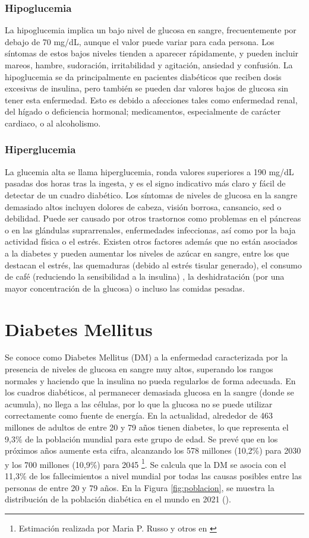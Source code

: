 \subsubsection{Hipoglucemia}
La hipoglucemia implica un bajo nivel de glucosa en sangre, frecuentemente por debajo de 70 mg/dL, aunque el valor puede variar para cada persona.
Los síntomas de estos bajos niveles tienden a aparecer rápidamente, y pueden incluir mareos, hambre, sudoración, irritabilidad y agitación, ansiedad y confusión. 
La hipoglucemia se da principalmente en pacientes diabéticos que reciben dosis excesivas de insulina, pero también se pueden dar valores bajos de glucosa sin tener esta enfermedad. Esto es debido a afecciones tales como enfermedad renal, del hígado o deficiencia hormonal; medicamentos, especialmente de carácter cardiaco, o al alcoholismo. 

\subsubsection{Hiperglucemia} \label{sec:hiperglucemia}
La glucemia alta se llama hiperglucemia, ronda valores superiores a 190 mg/dL pasadas dos horas tras la ingesta, y es el signo indicativo más claro y fácil de detectar de un cuadro diabético. 
Los síntomas de niveles de glucosa en la sangre demasiado altos incluyen dolores de cabeza, visión borrosa, cansancio, sed o debilidad. Puede ser causado por otros trastornos como problemas en el páncreas o en las glándulas suprarrenales, enfermedades infeccionas, así como por la baja actividad física o el estrés. Existen otros factores además que no están asociados a la diabetes y pueden aumentar los niveles de azúcar en sangre, entre los que destacan el estrés, las quemaduras (debido al estrés tisular generado), el consumo de café (reduciendo la sensibilidad a la insulina) ,  la deshidratación (por una mayor concentración de la glucosa) o incluso las comidas pesadas.

\section{Diabetes Mellitus}

Se conoce como Diabetes Mellitus (DM) a la enfermedad caracterizada por la presencia de niveles de glucosa en sangre muy altos, superando los rangos normales y haciendo que la insulina no pueda regularlos de forma adecuada. En los cuadros diabéticos, al permanecer demasiada glucosa en la sangre (donde se acumula), no llega a las células, por lo que la glucosa no se puede utilizar correctamente como fuente de energía.
En la actualidad, alrededor de 463 millones de adultos de entre 20 y 79 años tienen diabetes, lo que representa el 9,3\% de la población mundial para este grupo de edad.  Se prevé que en los próximos años aumente esta cifra, alcanzando los 578 millones (10,2\%) para 2030 y los 700 millones (10,9\%) para 2045 \footnote{Estimación realizada por Maria P. Russo y otros en \cite{russo2023prevalencia}}. Se calcula que la DM se asocia con el 11,3\% de los fallecimientos a nivel mundial por todas las causas posibles entre las personas de entre 20 y 79 años.
En la Figura \ref{fig:poblacion}, se muestra la distribución de la población diabética en el mundo en 2021 (\cite{epdata_diabetes}).

